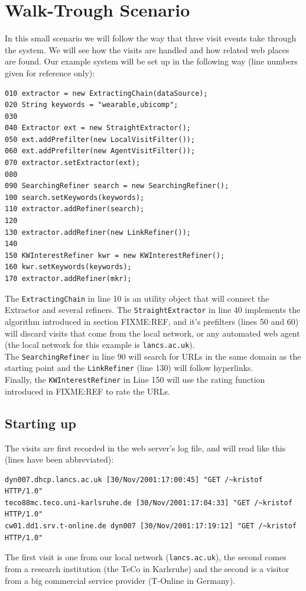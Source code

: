 \documentclass[a4paper]{danarticle}
\theoremstyle{remark}
\begin{document}
  \section{Walk-Trough Scenario}
    In this small scenario we will follow the way that three visit events take    
    through the system. We will see how the visits are handled and how related 
    web places are found. Our example system will be set up in the following 
    way (line numbers given for reference only):
    \begin{verbatim}
010 extractor = new ExtractingChain(dataSource);
020 String keywords = "wearable,ubicomp";
030  
040 Extractor ext = new StraightExtractor();
050 ext.addPrefilter(new LocalVisitFilter());
060 ext.addPrefilter(new AgentVisitFilter());
070 extractor.setExtractor(ext);
080        
090 SearchingRefiner search = new SearchingRefiner();
100 search.setKeywords(keywords);
110 extractor.addRefiner(search);
120        
130 extractor.addRefiner(new LinkRefiner());
140                
150 KWInterestRefiner kwr = new KWInterestRefiner(); 
160 kwr.setKeywords(keywords); 
170 extractor.addRefiner(mkr); 
      \end{verbatim} 
      The \verb$ExtractingChain$ in line 10 is an utility object that will 
      connect the Extractor and several refiners. The \verb$StraightExtractor$ 
      in line 40 implements the algorithm introduced in section FIXME:REF, and 
      it's prefilters (lines 50 and 60) will discard visits that come from the 
      local network, or any automated web agent (the local network for this
      example is \verb$lancs.ac.uk$).
      \\
      The \verb$SearchingRefiner$ in line 90 will search for URLs in the same 
      domain as the starting point and the \verb$LinkRefiner$ (line 130) will 
      follow hyperlinks.
      \\
      Finally, the \verb$KWInterestRefiner$ in Line 150 will use the rating 
      function introduced in FIXME:REF to rate the URLs.
    \subsection*{Starting up}
      The visits are first recorded in the web server's log file, and will read
      like this (lines have been abbreviated):
      \begin{verbatim}
dyn007.dhcp.lancs.ac.uk [30/Nov/2001:17:00:45] "GET /~kristof HTTP/1.0"
teco88mc.teco.uni-karlsruhe.de [30/Nov/2001:17:04:33] "GET /~kristof HTTP/1.0"
cw01.dd1.srv.t-online.de dyn007 [30/Nov/2001:17:19:12] "GET /~kristof HTTP/1.0"
      \end{verbatim}
      The first visit is one from our local network (\verb$lancs.ac.uk$), the
      second comes from a research institution (the TeCo in Karlsruhe) and the
      second is a visitor from a big commercial service provider (T-Online in
      Germany).
      
\end{document}
